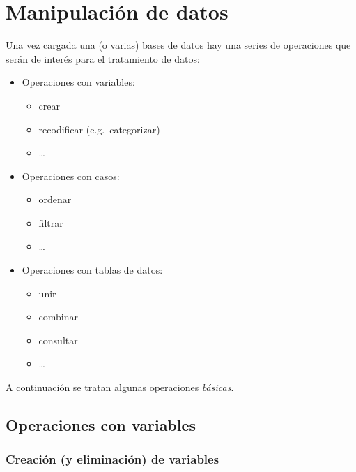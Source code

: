 \documentclass[
]{book}
\providecommand{\tightlist}{%
  \setlength{\itemsep}{0pt}\setlength{\parskip}{0pt}}
\begin{document}
\hypertarget{manipulaciuxf3n-de-datos}{%
\section{Manipulación de datos}\label{manipulaciuxf3n-de-datos}}

Una vez cargada una (o varias) bases
de datos hay una series de operaciones que serán de interés para el
tratamiento de datos:

\begin{itemize}
\tightlist
\item
  Operaciones con variables:

  \begin{itemize}
  \tightlist
  \item
    crear
  \item
    recodificar (e.g.~categorizar)
  \item
    \ldots{}
  \end{itemize}
\item
  Operaciones con casos:

  \begin{itemize}
  \tightlist
  \item
    ordenar
  \item
    filtrar
  \item
    \ldots{}
  \end{itemize}
\item
  Operaciones con tablas de datos:

  \begin{itemize}
  \tightlist
  \item
    unir
  \item
    combinar
  \item
    consultar
  \item
    \ldots{}
  \end{itemize}
\end{itemize}

A continuación se tratan algunas operaciones \emph{básicas}.

\hypertarget{operaciones-con-variables}{%
\subsection{Operaciones con variables}\label{operaciones-con-variables}}

\hypertarget{creaciuxf3n-y-eliminaciuxf3n-de-variables}{%
\subsubsection{Creación (y eliminación) de variables}\label{creaciuxf3n-y-eliminaciuxf3n-de-variables}}
\end{document}
